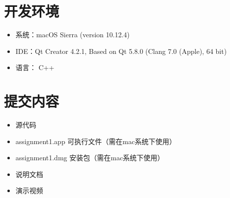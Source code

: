 \documentclass{article}
\begin{document}
\begin{CJK}{UTF8}{gbsn}
\vspace{3em}
\section{开发环境}
\begin{itemize}
	\item 系统：macOS Sierra (version 10.12.4)
	\item IDE：Qt Creator 4.2.1, Based on Qt 5.8.0 (Clang 7.0 (Apple), 64 bit)
	\item 语言： C++
\end{itemize}

\vspace{3em}
\section{提交内容}
\begin{itemize}
	\item 源代码
	\item assignment1.app 可执行文件（需在mac系统下使用）
	\item assignment1.dmg 安装包（需在mac系统下使用）
	\item 说明文档
	\item 演示视频
\end{itemize}

\end{CJK}
\end{document}
